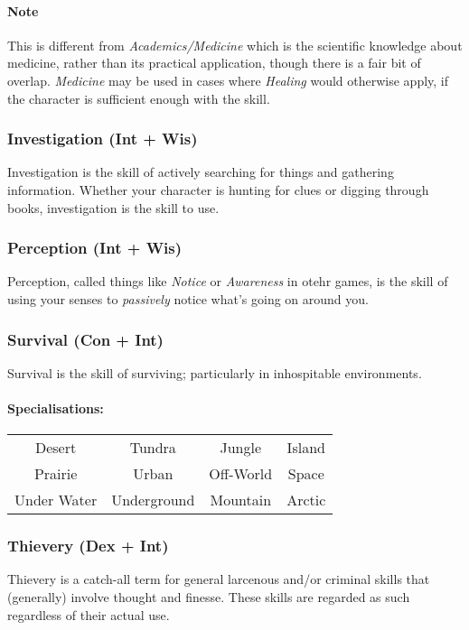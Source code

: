 \paragraph{Note} This is different from \textit{Academics/Medicine} which is the scientific knowledge about medicine, rather than its practical application, though there is a fair bit of overlap. 
\textit{Medicine} may be used in cases where \textit{Healing} would otherwise apply, if the character is sufficient enough with the skill.

\subsubsection{Investigation (Int + Wis)}
Investigation is the skill of actively searching for things and gathering information.
Whether your character is hunting for clues or digging through books, investigation is the skill to use.

\subsubsection{Perception (Int + Wis)}
Perception, called things like \textit{Notice} or \textit{Awareness} in otehr games, is the skill of using your senses to \textit{passively} notice what's going on around you.

\subsubsection{Survival (Con + Int)}
Survival is the skill of surviving; particularly in inhospitable environments.

\paragraph{Specialisations:}
\begin{center}
    \begin{tabular}{c|c|c|c}
        Desert & Tundra & Jungle & Island \\
        Prairie & Urban & Off-World & Space \\
        Under Water & Underground & Mountain & Arctic \\
    \end{tabular}
\end{center}

\subsubsection{Thievery (Dex + Int)}
Thievery is a catch-all term for general larcenous and/or criminal skills that (generally) involve thought and finesse.
These skills are regarded as such regardless of their actual use.

